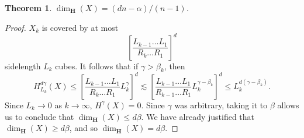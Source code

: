 \documentclass[usenames,dvipsnames]{article}
\theoremstyle{plain}
\theoremstyle{plain}
\newtheorem{theorem}{Theorem}
\begin{document}
\begin{theorem}
	$\dim_{\mathbf{H}}(X) = (dn - \alpha)/(n-1)$.
\end{theorem}
\begin{proof}
	$X_k$ is covered by at most
	\[ \left[ \frac{L_{k-1} \dots L_1}{R_k \dots R_1} \right]^d \]
	sidelength $L_k$ cubes. It follows that if $\gamma > \beta_k$, then
	\[ H^{d\gamma}_{L_k}(X) \leq \left[ \frac{L_{k-1} \dots L_1}{R_k \dots R_1} L_k^\gamma \right]^d \lesssim \left[ \frac{L_{k-1} \dots L_1}{R_{k-1} \dots R_1} L_k^{\gamma - \beta_k} \right]^d \leq L_k^{d(\gamma - \beta_k)}. \]
	Since $L_k \to 0$ as $k \to \infty$, $H^\gamma(X) = 0$. Since $\gamma$ was arbitrary, taking it to $\beta$ allows us to conclude that $\dim_{\mathbf{H}}(X) \leq d \beta$. We have already justified that $\dim_{\mathbf{H}}(X) \geq d\beta$, and so $\dim_{\mathbf{H}}(X) = d \beta$.
\end{proof}


\end{document}

